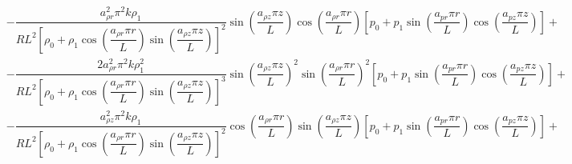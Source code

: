 \documentclass[a4paper,10pt]{article}
\begin{document}
\begin{landscape}
\begin{equation}
\begin{split}
%
&-\dfrac{a_{\rho r}^2 \pi^2 k\rho_1 }{R L^2 \left[\rho_0 + \rho_1 \cos\left(\dfrac{a_{\rho r} \pi r}{L}\right) \sin\left(\dfrac{a_{\rho z} \pi z}{L}\right) \right]^2}\sin\left(\dfrac{a_{\rho z} \pi z}{L}\right)\cos\left(\dfrac{a_{\rho r} \pi r}{L}\right) \left[p_0 + p_1 \sin\left(\dfrac{a_{pr} \pi r}{L}\right) \cos\left(\dfrac{a_{pz} \pi z}{L}\right) \right]+\\
&-\dfrac{2a_{\rho r}^2 \pi^2 k \rho_1^2}{R L^2 \left[\rho_0 + \rho_1 \cos\left(\dfrac{a_{\rho r} \pi r}{L}\right) \sin\left(\dfrac{a_{\rho z} \pi z}{L}\right) \right]^3}\sin\left(\dfrac{a_{\rho z} \pi z}{L}\right)^2  \sin\left(\dfrac{a_{\rho r} \pi r}{L}\right)^2 \left[p_0 + p_1 \sin\left(\dfrac{a_{pr} \pi r}{L}\right) \cos\left(\dfrac{a_{pz} \pi z}{L}\right) \right] +\\
&-\dfrac{a_{\rho z}^2 \pi^2 k \rho_1}{R L^2 \left[\rho_0 + \rho_1 \cos\left(\dfrac{a_{\rho r} \pi r}{L}\right) \sin\left(\dfrac{a_{\rho z} \pi z}{L}\right) \right]^2 }\cos\left(\dfrac{a_{\rho r} \pi r}{L}\right)\sin\left(\dfrac{a_{\rho z} \pi z}{L}\right) \left[p_0 + p_1 \sin\left(\dfrac{a_{pr} \pi r}{L}\right) \cos\left(\dfrac{a_{pz} \pi z}{L}\right) \right]  +
%
\end{split}
\end{equation}


\end{landscape}
\end{document}

